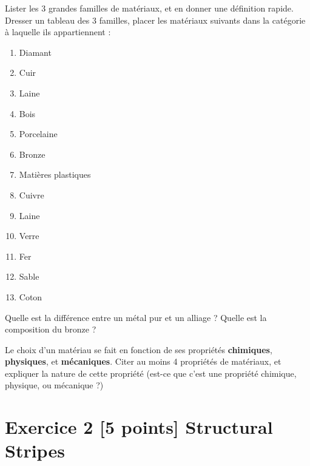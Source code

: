 \documentclass{exam}
\begin{document}
\begin{questions}
\question[1] Lister les 3 grandes familles de matériaux, et en donner une définition rapide.
\question[1] Dresser un tableau des 3 familles, placer les matériaux suivants dans la catégorie à laquelle ils appartiennent : 
  
\begin{enumerate}[noitemsep]
  \item Diamant
  \item Cuir
  \item Laine
  \item Bois 
  \item Porcelaine
  \item Bronze
  \item Matières plastiques
  \item Cuivre
  \item Laine 
  \item Verre
  \item Fer
  \item Sable 
  \item Coton 
\end{enumerate}

\question[1] Quelle est la différence entre un métal pur et un alliage ? Quelle est la composition du bronze ?

\question[1] Le choix d'un matériau se fait en fonction de ses propriétés \textbf{chimiques}, \textbf{physiques}, et \textbf{mécaniques}. Citer au moins 4 propriétés de matériaux, et expliquer la nature de cette propriété (est-ce que c'est une propriété chimique, physique, ou mécanique ?)

\end{questions}

\section*{Exercice 2 [5 points] Structural Stripes}
\end{document}
